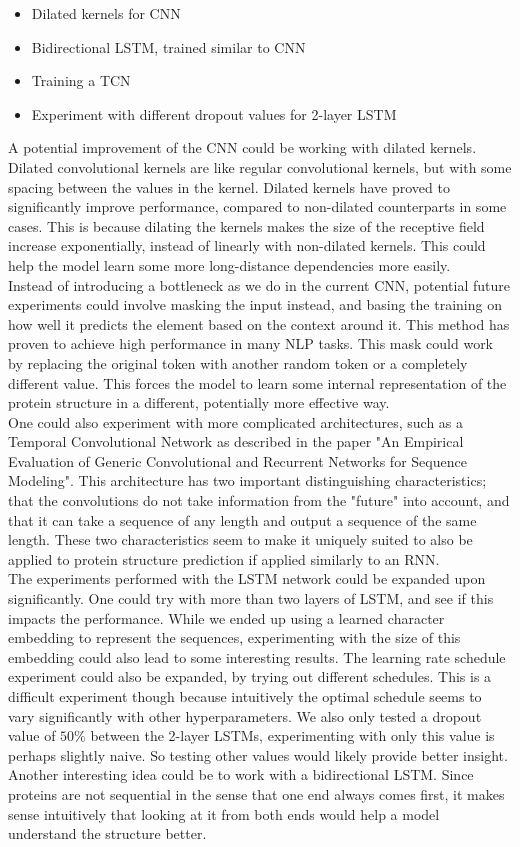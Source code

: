 \begin{itemize}
\item Dilated kernels for CNN
\item Bidirectional LSTM, trained similar to CNN
\item Training a TCN \cite{intro}
\item Experiment with different dropout values for 2-layer LSTM
\end{itemize}

\noindent
A potential improvement of the CNN could be working with dilated kernels. Dilated convolutional kernels are like regular convolutional kernels, but with some spacing between the values in the kernel. Dilated kernels have proved to significantly improve performance, compared to non-dilated counterparts in some cases.\cite{cp} This is because dilating the kernels makes the size of the receptive field increase exponentially, instead of linearly with non-dilated kernels. This could help the model learn some more long-distance dependencies more easily.\\

\noindent
Instead of introducing a bottleneck as we do in the current CNN, potential future experiments could involve masking the input instead, and basing the training on how well it predicts the element based on the context around it. This method has proven to achieve high performance in many NLP tasks\cite{BERT}. This mask could work by replacing the original token with another random token or a completely different value. This forces the model to learn some internal representation of the protein structure in a different, potentially more effective way.\\

\noindent
One could also experiment with more complicated architectures, such as a Temporal Convolutional Network as described in the paper "An Empirical Evaluation of Generic Convolutional and Recurrent Networks
for Sequence Modeling".\cite{tcnn} This architecture has two important distinguishing characteristics; that the convolutions do not take information from the "future" into account, and that it can take a sequence of any length and output a sequence of the same length. These two characteristics seem to make it uniquely suited to also be applied to protein structure prediction if applied similarly to an RNN.\\

\noindent
The experiments performed with the LSTM network could be expanded upon significantly. One could try with more than two layers of LSTM, and see if this impacts the performance.  While we ended up using a learned character embedding to represent the sequences, experimenting with the size of this embedding could also lead to some interesting results. The learning rate schedule experiment could also be expanded, by trying out different schedules. This is a difficult experiment though because intuitively the optimal schedule seems to vary significantly with other hyperparameters. We also only tested a dropout value of $50\%$ between the 2-layer LSTMs, experimenting with only this value is perhaps slightly naive. So testing other values would likely provide better insight.\\

\noindent
Another interesting idea could be to work with a bidirectional LSTM. Since proteins are not sequential in the sense that one end always comes first, it makes sense intuitively that looking at it from both ends would help a model understand the structure better.